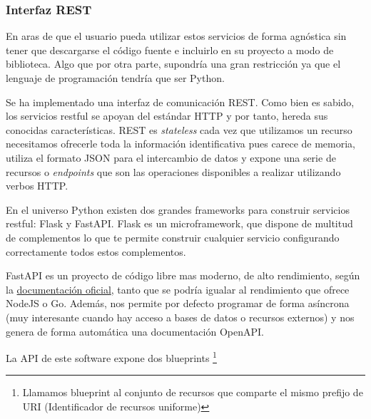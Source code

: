 \subsubsection{Interfaz REST}
En aras de que el usuario pueda utilizar estos servicios de forma agnóstica sin tener que
descargarse el código fuente e incluirlo en su proyecto a modo de biblioteca. Algo que por
otra parte, supondría una gran restricción ya que el lenguaje de programación tendría que
ser Python.

Se ha implementado una interfaz de comunicación REST. Como bien es sabido, los servicios
restful se apoyan del estándar HTTP y por tanto, hereda sus conocidas características.
REST es \textit{stateless} cada vez que utilizamos un recurso necesitamos ofrecerle toda
la información identificativa pues carece de memoria, utiliza el formato JSON para el
intercambio de datos y expone una serie de recursos o \textit{endpoints} que son las
operaciones disponibles a realizar utilizando verbos HTTP.

En el universo Python existen dos grandes frameworks para construir servicios restful:
Flask y FastAPI. Flask es un microframework, que dispone de multitud de complementos lo
que te permite construir cualquier servicio configurando correctamente todos estos
complementos. 

FastAPI es un proyecto de código libre mas moderno, de alto rendimiento, según la
 \href{https://fastapi.tiangolo.com}{documentación oficial}, tanto que se podría igualar
 al rendimiento que ofrece NodeJS o Go. Además, nos permite por defecto programar de forma
 asíncrona (muy interesante cuando hay acceso a bases de datos o recursos externos) y nos
 genera de forma automática una documentación OpenAPI.

La API de este software expone dos blueprints \footnote{Llamamos blueprint al conjunto de
recursos que comparte el mismo prefijo de URI (Identificador de recursos uniforme)}

